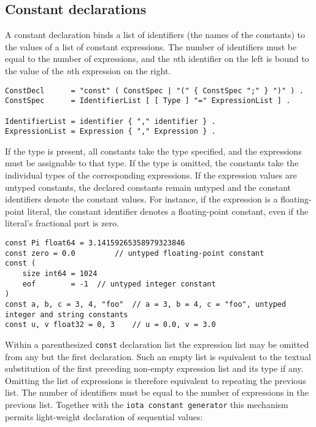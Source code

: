 \subsection*{Constant declarations}

A constant declaration binds a list of identifiers (the names of the
constants) to the values of a list of
constant expressions. The number of
identifiers must be equal to the number of expressions, and the
\emph{n}th identifier on the left is bound to the value of the
\emph{n}th expression on the right.

\begin{Verbatim}[frame=single]
ConstDecl      = "const" ( ConstSpec | "(" { ConstSpec ";" } ")" ) .
ConstSpec      = IdentifierList [ [ Type ] "=" ExpressionList ] .

IdentifierList = identifier { "," identifier } .
ExpressionList = Expression { "," Expression } .
\end{Verbatim}

If the type is present, all constants take the type specified, and the
expressions must be assignable to that type.
If the type is omitted, the constants take the individual types of the
corresponding expressions. If the expression values are untyped
constants, the declared constants remain untyped
and the constant identifiers denote the constant values. For instance,
if the expression is a floating-point literal, the constant identifier
denotes a floating-point constant, even if the literal's fractional part
is zero.

\begin{Verbatim}[frame=single]
const Pi float64 = 3.14159265358979323846
const zero = 0.0         // untyped floating-point constant
const (
    size int64 = 1024
    eof        = -1  // untyped integer constant
)
const a, b, c = 3, 4, "foo"  // a = 3, b = 4, c = "foo", untyped integer and string constants
const u, v float32 = 0, 3    // u = 0.0, v = 3.0
\end{Verbatim}

Within a parenthesized \texttt{const} declaration list the expression
list may be omitted from any but the first declaration. Such an empty
list is equivalent to the textual substitution of the first preceding
non-empty expression list and its type if any. Omitting the list of
expressions is therefore equivalent to repeating the previous list. The
number of identifiers must be equal to the number of expressions in the
previous list. Together with the \texttt{iota constant
generator} this mechanism permits light-weight declaration of sequential
values:


